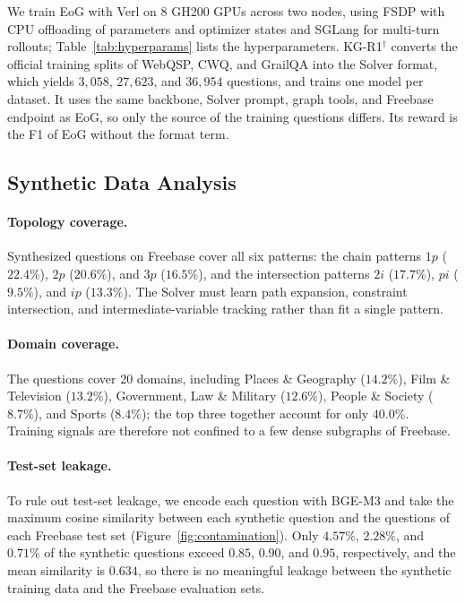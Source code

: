 We train EoG with Verl on 8 GH200 GPUs across two nodes, using FSDP with CPU offloading of parameters and optimizer states and SGLang for multi-turn rollouts; Table~\ref{tab:hyperparams} lists the hyperparameters. KG-R1$^\dagger$ converts the official training splits of WebQSP, CWQ, and GrailQA into the Solver format, which yields $3{,}058$, $27{,}623$, and $36{,}954$ questions, and trains one model per dataset. It uses the same backbone, Solver prompt, graph tools, and Freebase endpoint as EoG, so only the source of the training questions differs. Its reward is the F1 of EoG without the format term.

\subsection{Synthetic Data Analysis}
\label{app:contamination}

\paragraph{Topology coverage.}
Synthesized questions on Freebase cover all six patterns: the chain patterns $1p$ ($22.4\%$), $2p$ ($20.6\%$), and $3p$ ($16.5\%$), and the intersection patterns $2i$ ($17.7\%$), $pi$ ($9.5\%$), and $ip$ ($13.3\%$). The Solver must learn path expansion, constraint intersection, and intermediate-variable tracking rather than fit a single pattern.

\paragraph{Domain coverage.}
The questions cover 20 domains, including Places \& Geography ($14.2\%$), Film \& Television ($13.2\%$), Government, Law \& Military ($12.6\%$), People \& Society ($8.7\%$), and Sports ($8.4\%$); the top three together account for only $40.0\%$. Training signals are therefore not confined to a few dense subgraphs of Freebase.

\paragraph{Test-set leakage.}
To rule out test-set leakage, we encode each question with BGE-M3 and take the maximum cosine similarity between each synthetic question and the questions of each Freebase test set (Figure~\ref{fig:contamination}). Only $4.57\%$, $2.28\%$, and $0.71\%$ of the synthetic questions exceed $0.85$, $0.90$, and $0.95$, respectively, and the mean similarity is $0.634$, so there is no meaningful leakage between the synthetic training data and the Freebase evaluation sets.


